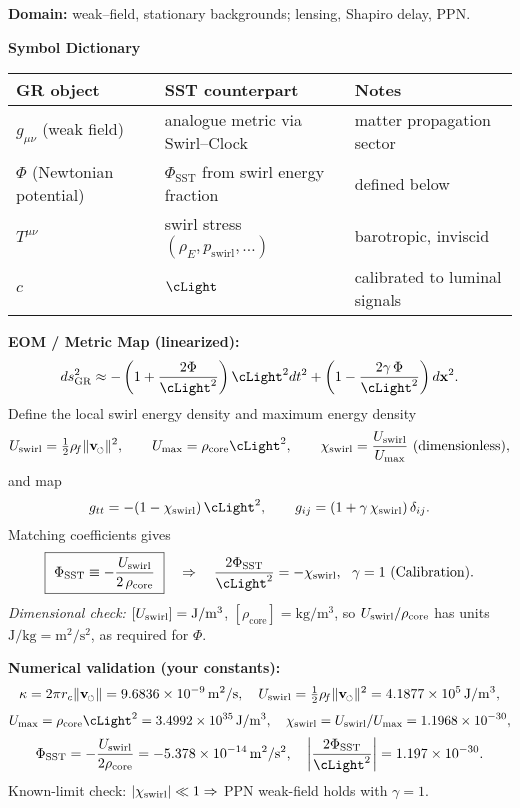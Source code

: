 \documentclass[11pt]{article}
\newcommand{\swirlarrow}{%
	\mathchoice{\mkern-2mu\scriptstyle\boldsymbol{\circlearrowleft}}%
	{\mkern-2mu\scriptstyle\boldsymbol{\circlearrowleft}}%
	{\mkern-2mu\scriptscriptstyle\boldsymbol{\circlearrowleft}}%
	{\mkern-2mu\scriptscriptstyle\boldsymbol{\circlearrowleft}}%
}
\newcommand{\vswirl}{\mathbf{v}_{\swirlarrow}}
\newcommand{\rhoF}{\rho_{\!f}}                           %
\newcommand{\rhoE}{\rho_{\!E}}                           %
\providecommand{\rc}{r_c} %
\begin{document}
    \begin{tcolorbox}[title=Rosetta Card: GR/PPN/GW $\to$ Swirl–String Theory (SST)]
    \textbf{Domain:} weak–field, stationary backgrounds; lensing, Shapiro delay, PPN.

    \textbf{Symbol Dictionary}
    \begin{tabular}{@{}lll@{}}
    \toprule
    GR object & SST counterpart & Notes \\
    \midrule
    $g_{\mu\nu}$ (weak field) & analogue metric via Swirl–Clock & matter propagation sector \\
    $\Phi$ (Newtonian potential) & $\Phi_{\text{SST}}$ from swirl energy fraction & defined below \\
    $T^{\mu\nu}$ & swirl stress $(\rhoE,p_{\text{swirl}},\ldots)$ & barotropic, inviscid \\
    $c$ & $\cLight$ & calibrated to luminal signals \\
    \bottomrule
    \end{tabular}

    \textbf{EOM / Metric Map (linearized):}
    \[
        ds^2_{\text{GR}} \approx -\left(1+\frac{2\Phi}{\cLight^2}\right)\cLight^2 dt^2
        +\left(1-\frac{2\gamma\,\Phi}{\cLight^2}\right)d\mathbf{x}^2 .
    \]
    Define the local swirl energy density and maximum energy density
    \[
        \Uloc = \tfrac{1}{2}\rhoF \lVert \vswirl\rVert^2,\qquad
        \Umax = \rho_{\text{core}}\cLight^2,\qquad
        \chiS = \frac{\Uloc}{\Umax}\ (\text{dimensionless}),
    \]
    and map
    \[
        g_{tt} = -\!\left(1-\chiS\right)\cLight^2,\qquad
        g_{ij} = \left(1+\gamma\,\chiS\right)\delta_{ij}.
    \]
    Matching coefficients gives
    \[
        \boxed{\ \Phi_{\text{SST}} \equiv -\frac{\Uloc}{2\,\rho_{\text{core}}}\ } \quad\Rightarrow\quad
        \frac{2\Phi_{\text{SST}}}{\cLight^2} = -\chiS,\ \ \gamma=1\ (\text{Calibration}).
    \]
    \emph{Dimensional check:} $[U_{\text{swirl}}]=\mathrm{J/m^3}$, $[\rho_{\text{core}}]=\mathrm{kg/m^3}$, so
    $U_{\text{swirl}}/\rho_{\text{core}}$ has units $\mathrm{J/kg}=\mathrm{m^2/s^2}$, as required for $\Phi$.

    \textbf{Numerical validation (your constants):}
    \[
        \Circulation = 2\pi\rc\lVert\vswirl\rVert
        = \SI{9.6836e-9}{m^2/s},
        \quad
        \Uloc=\tfrac{1}{2}\rhoF \lVert \vswirl\rVert^2=\SI{4.1877e5}{J/m^3},
    \]
    \[
        \Umax = \rho_{\text{core}}\cLight^2 = \SI{3.4992e35}{J/m^3},
        \quad
        \chiS = \Uloc/\Umax = \SI{1.1968e-30}{},
    \]
    \[
        \Phi_{\text{SST}} = -\frac{\Uloc}{2\rho_{\text{core}}}
        = \SI{-5.378e-14}{m^2/s^2},
        \quad
        \left|\frac{2\Phi_{\text{SST}}}{\cLight^2}\right|=\SI{1.197e-30}{}.
    \]
    Known-limit check: $|\chi_{\text{swirl}}|\ll 1 \Rightarrow$ PPN weak-field holds with $\gamma=1$.


\end{tcolorbox}
\end{document}
